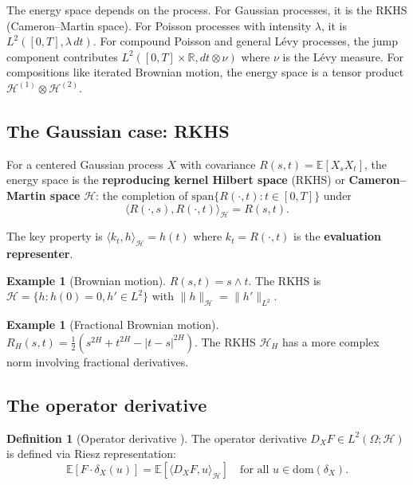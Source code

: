\documentclass[11pt]{article}
\theoremstyle{definition}
\newtheorem{definition}[theorem]{Definition}
\newtheorem{example}[theorem]{Example}
\newcommand{\E}{\mathbb{E}}
\newcommand{\R}{\mathbb{R}}
\newcommand{\Hi}{\mathcal{H}}
\newcommand{\ip}[2]{\langle #1, #2 \rangle}
\begin{document}
The energy space depends on the process. For Gaussian processes, it is the RKHS (Cameron--Martin space). For Poisson processes with intensity $\lambda$, it is $L^2([0,T], \lambda\,dt)$. For compound Poisson and general L\'evy processes, the jump component contributes $L^2([0,T] \times \R, dt \otimes \nu)$ where $\nu$ is the L\'evy measure. For compositions like iterated Brownian motion, the energy space is a tensor product $\Hi^{(1)} \otimes \Hi^{(2)}$.

\subsection{The Gaussian case: RKHS}

For a centered Gaussian process $X$ with covariance $R(s,t) = \E[X_s X_t]$, the energy space is the \textbf{reproducing kernel Hilbert space} (RKHS) or \textbf{Cameron--Martin space} $\Hi$: the completion of $\mathrm{span}\{R(\cdot, t) : t \in [0,T]\}$ under
\begin{equation}
\ip{R(\cdot,s)}{R(\cdot,t)}_\Hi = R(s,t).
\end{equation}

The key property is $\ip{k_t}{h}_\Hi = h(t)$ where $k_t = R(\cdot, t)$ is the \textbf{evaluation representer}.

\begin{example}[Brownian motion]
$R(s,t) = s \wedge t$. The RKHS is $\Hi = \{h : h(0) = 0, h' \in L^2\}$ with $\|h\|_\Hi = \|h'\|_{L^2}$.
\end{example}

\begin{example}[Fractional Brownian motion]
$R_H(s,t) = \frac{1}{2}(s^{2H} + t^{2H} - |t-s|^{2H})$. The RKHS $\Hi_H$ has a more complex norm involving fractional derivatives.
\end{example}

\subsection{The operator derivative}

\begin{definition}[Operator derivative \cite{PaperIV}]
The operator derivative $D_X F \in L^2(\Omega; \Hi)$ is defined via Riesz representation:
\begin{equation}\label{eq:riesz-def}
\E[F \cdot \delta_X(u)] = \E[\ip{D_X F}{u}_\Hi] \quad \text{for all } u \in \mathrm{dom}(\delta_X).
\end{equation}
\end{definition}
\end{document}
